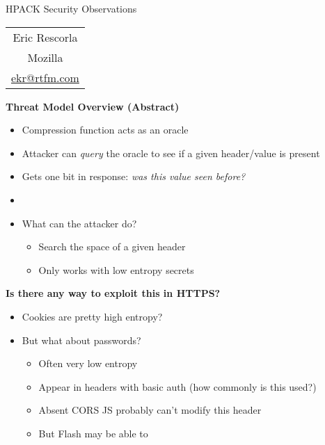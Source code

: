 \documentclass[helvetica]{seminar}
\newcommand{\heading}[1]{%
  \begin{center} 
    \large\bf 
    #1 
  \end{center} 
  \vspace{.4 in}}
\begin{document}
\begin{slide}
\begin{center}
\vspace{.5 in}
\LARGE{{\bf}HPACK Security Observations}\\
\vspace{.2in}
\vspace{3em}
\large{
\begin{tabular}{c}
Eric Rescorla\\
Mozilla\\
\url{ekr@rtfm.com}
\end{tabular}
}
\end{center}

\end{slide}

\centerslidesfalse 


\begin{slide}
\heading{Threat Model Overview (Abstract)}

\begin{itemize}
\item Compression function acts as an oracle
\item Attacker can \emph{query} the oracle to see if a given header/value is present
\item Gets one bit in response: \emph{was this value seen before?}
\item[]
\item What can the attacker do?
  \begin{itemize}
  \item Search the space of a given header
  \item Only works with low entropy secrets
  \end{itemize}
\end{itemize}
\end{slide}


\begin{slide}
\heading{Is there any way to exploit this in HTTPS?}

\begin{itemize}
\item Cookies are pretty high entropy?
\item But what about passwords?
  \begin{itemize}
  \item Often very low entropy
  \item Appear in headers with basic auth (how commonly is this used?)
  \item Absent CORS JS probably can't modify this header
  \item But Flash may be able to
  \end{itemize}
\end{itemize}
\end{slide}
\end{document}
